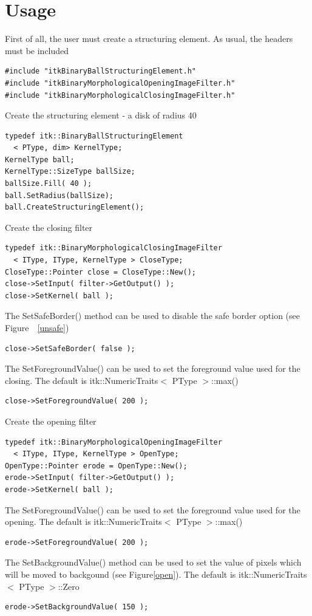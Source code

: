 \documentclass{InsightArticle}
\begin{document}
\section{Usage}

First of all, the user must create a structuring element. As usual, the headers must be included

\begin{lstlisting}
#include "itkBinaryBallStructuringElement.h"
#include "itkBinaryMorphologicalOpeningImageFilter.h"
#include "itkBinaryMorphologicalClosingImageFilter.h"
\end{lstlisting}
Create the structuring element - a disk of radius 40
\begin{lstlisting}
typedef itk::BinaryBallStructuringElement
  < PType, dim> KernelType;
KernelType ball;
KernelType::SizeType ballSize;
ballSize.Fill( 40 );
ball.SetRadius(ballSize);
ball.CreateStructuringElement();
\end{lstlisting}
Create the closing filter
\begin{lstlisting}
typedef itk::BinaryMorphologicalClosingImageFilter
  < IType, IType, KernelType > CloseType;
CloseType::Pointer close = CloseType::New();
close->SetInput( filter->GetOutput() );
close->SetKernel( ball );
\end{lstlisting}
The SetSafeBorder() method can be used to disable the safe border option (see Figure~~\ref{unsafe})
\begin{lstlisting}
close->SetSafeBorder( false );
\end{lstlisting}
The SetForegroundValue() can be used to set the foreground value used for the closing. The default is itk::NumericTraits$<$ PType $>$::max()
\begin{lstlisting}
close->SetForegroundValue( 200 );
\end{lstlisting}
Create the opening filter
\begin{lstlisting}
typedef itk::BinaryMorphologicalOpeningImageFilter
  < IType, IType, KernelType > OpenType;
OpenType::Pointer erode = OpenType::New();
erode->SetInput( filter->GetOutput() );
erode->SetKernel( ball );
\end{lstlisting}
The SetForegroundValue() can be used to set the foreground value used for the opening. The default is itk::NumericTraits$<$ PType $>$::max()
\begin{lstlisting}
erode->SetForegroundValue( 200 );
\end{lstlisting}
The SetBackgroundValue() method can be used to set the value of pixels which will be moved to backgound (see Figure\ref{open}). The default is itk::NumericTraits$<$ PType $>$::Zero
\begin{lstlisting}
erode->SetBackgroundValue( 150 );
\end{lstlisting}
\end{document}
